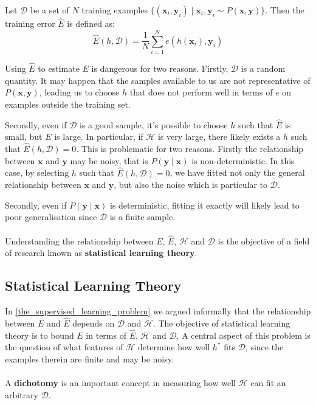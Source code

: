 \begin{definition}
	Let $\mathcal{D}$ be a set of $N$ training examples $\{(\mathbf{x}_i, \mathbf{y}_i) \mid \mathbf{x}_i, \mathbf{y}_i \sim P(\mathbf{x}, \mathbf{y})\}$. Then the training error $\hat{E}$ is defined as:
	$$
		\hat{E}(h, \mathcal{D}) = \frac{1}{N}\sum\limits_{i=1}^N e(h(\mathbf{x}_i), \mathbf{y}_i)
	$$
\end{definition}
Using $\hat{E}$ to estimate $E$ is dangerous for two reasons. Firstly, $\mathcal{D}$ is a random quantity. It may happen that the samples available to us are not representative of $P(\mathbf{x}, \mathbf{y})$, leading us to choose $h$ that does not perform well in terms of $e$ on examples outside the training set.

Secondly, even if $\mathcal{D}$ is a good sample, it's possible to choose $h$ such that $\hat{E}$ is small, but $E$ is large. In particular, if $\mathcal{H}$ is very large, there likely exists a $h$ such that $\hat{E}(h, \mathcal{D}) = 0$. This is problematic for two reasons. Firstly the relationship between $\mathbf{x}$ and $\mathbf{y}$ may be noisy, that is $P(\mathbf{y} \mid \mathbf{x})$ is non-deterministic. In this case, by selecting $h$ such that $\hat{E}(h, \mathcal{D}) = 0$, we have fitted not only the general relationship between $\mathbf{x}$ and $\mathbf{y}$, but also the noise which is particular to $\mathcal{D}$.

Secondly, even if $P(\mathbf{y} \mid \mathbf{x})$ is deterministic, fitting it exactly will likely lead to poor generalisation since $\mathcal{D}$ is a finite sample. 
\\\\
Understanding the relationship between $E$, $\hat{E}$, $\mathcal{H}$ and $\mathcal{D}$ is the objective of a field of research known as \textbf{statistical learning theory}.

\subsection{Statistical Learning Theory}
In \ref{the_supervised_learning_problem} we argued informally that the relationship between $E$ and $\hat{E}$ depends on $\mathcal{D}$ and $\mathcal{H}$. The objective of statistical learning theory is to bound $E$ in terms of $\hat{E}$, $\mathcal{H}$ and $\mathcal{D}$. A central aspect of this problem is the question of what features of $\mathcal{H}$ determine how well $h^*$ fits $\mathcal{D}$, since the examples therein are finite and may be noisy.
\\\\
A \textbf{dichotomy} is an important concept in measuring how well $\mathcal{H}$ can fit an arbitrary $\mathcal{D}$.